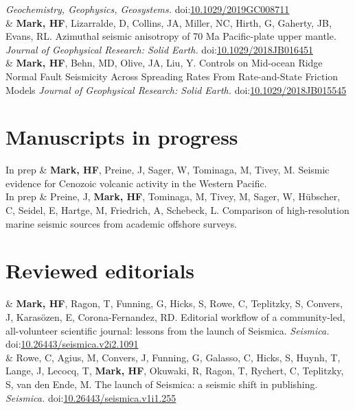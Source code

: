 \documentclass[10pt, letterpaper]{article}
\newcommand{\LastName}{Mark}
\newcommand{\Initials}{HF}  %
\newcommand{\Me}{\textbf{\LastName, \Initials}}  %
\newcommand{\Jim}{Gaherty, JB}
\newcommand{\Greg}{Hirth, G}
\newcommand{\danl}{Lizarralde, D}
\newcommand{\jac}{Collins, JA}
\newcommand{\behn}{Behn, MD}
\newcommand{\RobE}{Evans, RL}
\newcommand{\jao}{Olive, JA}
\newcommand{\Nate}{Miller, NC}
\newcommand{\Yajing}{Liu, Y}
\newcommand{\Masako}{Tominaga, M}
\newcommand{\WSage}{Sager, W}
\newcommand{\CRowe}{Rowe, C}
\newcommand{\MAgi}{Agius, M}
\newcommand{\JConv}{Convers, J}
\newcommand{\GFun}{Funning, G}
\newcommand{\CGal}{Galasso, C}
\newcommand{\SHic}{Hicks, S}
\newcommand{\THuy}{Huynh, T}
\newcommand{\JLan}{Lange, J}
\newcommand{\TLec}{Lecocq, T}
\newcommand{\ROku}{Okuwaki, R}
\newcommand{\Thea}{Ragon, T}
\newcommand{\CRyc}{Rychert, C}
\newcommand{\STep}{Teplitzky, S}
\newcommand{\MvdE}{van den Ende, M}
\newcommand{\EKar}{Karasözen, E}
\newcommand{\RDCF}{Corona-Fernandez, RD}
\newcommand{\Maurice}{Tivey, M}
\newcommand{\Jonas}{Preine, J}
\newcommand{\DOI}[1]{doi:\href{https://doi.org/#1}{#1}}
\newcommand{\Year}[1]{\fontsize{9pt}{0}\selectfont #1}
\begin{document}
\begin{EntriesTable}
  \emph{Geochemistry, Geophysics, Geosystems.}
  \DOI{10.1029/2019GC008711}
  \\
\Year{2019}  &
  \Me, \danl, \jac, \Nate, \Greg, \Jim, \RobE.
  Azimuthal seismic anisotropy of 70 Ma Pacific-plate upper mantle. 
  \emph{Journal of Geophysical Research: Solid Earth.}
  \DOI{10.1029/2018JB016451}
  \\
\Year{2018}  &
  \Me, \behn, \jao, \Yajing.
  Controls on Mid-ocean Ridge Normal Fault Seismicity Across Spreading Rates From Rate-and-State Friction Models 
  \emph{Journal of Geophysical Research: Solid Earth.}
  \DOI{10.1029/2018JB015545}
  \\
\end{EntriesTable}

\section{Manuscripts in progress}

\begin{EntriesTable}
\Year{In prep} &
  \Me, \Jonas, \WSage, \Masako, \Maurice.
  Seismic evidence for Cenozoic volcanic activity in the Western Pacific.
\\
\Year{In prep} &
  \Jonas, \Me, \Masako, \Maurice, \WSage, Hübscher, C, Seidel, E, Hartge, M, Friedrich, A, Schebeck, L.
  Comparison of high-resolution marine seismic sources from academic offshore surveys.
\end{EntriesTable}


\section{Reviewed editorials}

\begin{EntriesTable}
\Year{2023}  &
  \Me, \Thea, \GFun, \SHic, \CRowe, \STep, \JConv, \EKar, \RDCF.
  Editorial workflow of a community-led, all-volunteer scientific journal: lessons from the launch of Seismica.
  \emph{Seismica.}
  \DOI{10.26443/seismica.v2i2.1091} \\
\Year{2022}  &
  \CRowe, \MAgi, \JConv, \GFun, \CGal, \SHic, \THuy, \JLan, \TLec, \Me, \ROku, \Thea, \CRyc, \STep, \MvdE. 
  The launch of Seismica: a seismic shift in publishing. 
  \emph{Seismica.}
  \DOI{10.26443/seismica.v1i1.255}
\end{EntriesTable}
\end{document}
